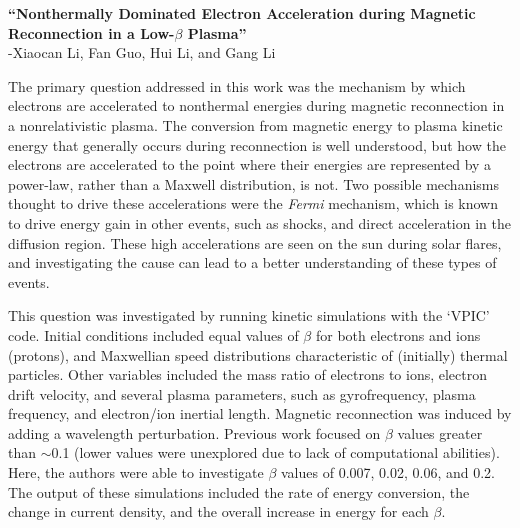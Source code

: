 \documentclass[12pt]{article}
\begin{document}
\begin{center}\large\textbf{
``Nonthermally Dominated Electron Acceleration during Magnetic
Reconnection in a Low-\boldmath$\beta$ Plasma''}\\
\normalsize-Xiaocan Li, Fan Guo, Hui Li, and Gang Li
\end{center}
The primary question addressed in this work was the
mechanism by which electrons are accelerated to
nonthermal energies during magnetic reconnection in a nonrelativistic
plasma.
The conversion from magnetic energy to plasma kinetic energy
that generally occurs during reconnection is well understood,
but how the electrons are accelerated to the point where their
energies are represented by a power-law, rather than a Maxwell
distribution, is not.
Two possible mechanisms thought to drive these accelerations were
the \emph{Fermi} mechanism, which is known to drive energy gain
in other events, such as shocks, and direct acceleration in the diffusion
region.
These high accelerations are seen on the sun during solar flares,
and investigating the cause can lead to a better understanding of
these types of events.

This
question was investigated by running kinetic simulations with the
`VPIC' code.
Initial conditions included
equal values of $\beta$ for both electrons and ions (protons),
and Maxwellian speed distributions characteristic of (initially)
thermal particles.
Other variables included the mass ratio of electrons to ions,
electron drift velocity, and several plasma parameters, such as
gyrofrequency, plasma frequency, and electron/ion inertial length.
Magnetic reconnection was induced by adding
a wavelength perturbation.
Previous work focused on $\beta$ values greater than $\sim$0.1
(lower values were unexplored due to lack of
computational abilities).
Here, the authors were able to investigate $\beta$ values of
0.007, 0.02, 0.06, and 0.2. The output of these simulations included
the rate of energy conversion, the change in current density,
and the overall increase in energy for each $\beta$.
\end{document}
